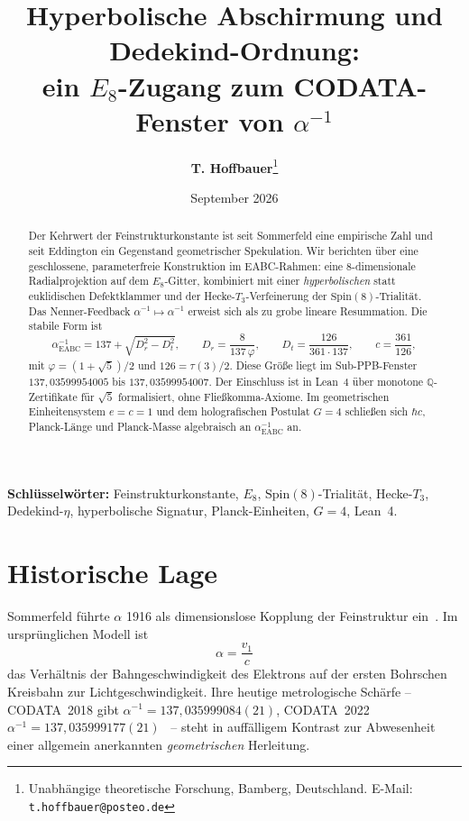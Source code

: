 \documentclass[11pt,a4paper]{article}
\title{\textbf{\texorpdfstring{Hyperbolische Abschirmung und Dedekind-Ordnung:\\
ein $E_8$-Zugang zum CODATA-Fenster von $\alpha^{-1}$}{Hyperbolische Abschirmung und Dedekind-Ordnung: ein E8-Zugang zum CODATA-Fenster von alpha^{-1}}}}
\author{\textbf{T. Hoffbauer}\thanks{Unabhängige theoretische Forschung, Bamberg, Deutschland.
E-Mail: \texttt{t.hoffbauer@posteo.de}}}
\date{September 2026}
\begin{document}
\maketitle

\begin{abstract}
\noindent
Der Kehrwert der Feinstrukturkonstante ist seit Sommerfeld eine empirische Zahl und seit Eddington ein Gegenstand geometrischer Spekulation.
Wir berichten über eine geschlossene, parameterfreie Konstruktion im EABC-Rahmen:
eine $8$-dimensionale Radialprojektion auf dem $E_8$-Gitter, kombiniert mit einer \emph{hyperbolischen} statt euklidischen Defektklammer und der Hecke-$T_3$-Verfeinerung der $\mathrm{Spin}(8)$-Trialität.
Das Nenner-Feedback $\alpha^{-1}\mapsto\alpha^{-1}$ erweist sich als zu grobe lineare Resummation.
Die stabile Form ist
\[
\alpha^{-1}_{\mathrm{EABC}}
= 137 + \sqrt{D_r^2 - D_t^2},\qquad
D_r=\frac{8}{137\,\varphi},\qquad
D_t=\frac{126}{361\cdot 137},\qquad
c=\frac{361}{126},
\]
mit $\varphi=(1+\sqrt{5})/2$ und $126=\tau(3)/2$.
Diese Größe liegt im Sub-PPB-Fenster $137{,}03599954005$ bis $137{,}03599954007$.
Der Einschluss ist in Lean~4 über monotone $\mathbb{Q}$-Zertifikate für $\sqrt{5}$ formalisiert, ohne Fließkomma-Axiome.
Im geometrischen Einheitensystem $e=c=1$ und dem holografischen Postulat $G=4$ schließen sich $\hbar c$, Planck-Länge und Planck-Masse algebraisch an $\alpha^{-1}_{\mathrm{EABC}}$ an.
\end{abstract}

\noindent\textbf{Schlüsselwörter:}
Feinstrukturkonstante, $E_8$, $\mathrm{Spin}(8)$-Trialität, Hecke-$T_3$,\\
Dedekind-$\eta$, hyperbolische Signatur, Planck-Einheiten, $G=4$, Lean~4.

\section{Historische Lage}

Sommerfeld führte $\alpha$ 1916 als dimensionslose Kopplung der Feinstruktur ein~\cite{sommerfeld1916}.
Im ursprünglichen Modell ist
\begin{equation}
\alpha=\frac{v_1}{c}
\end{equation}
das Verhältnis der Bahngeschwindigkeit des Elektrons auf der ersten Bohrschen Kreisbahn zur Lichtgeschwindigkeit.
Ihre heutige metrologische Schärfe -- CODATA~2018 gibt $\alpha^{-1}=137{,}035999084(21)$,
CODATA~2022 $\alpha^{-1}=137{,}035999177(21)$~\cite{codata2018,codata2022} --
steht in auffälligem Kontrast zur Abwesenheit einer allgemein anerkannten \emph{geometrischen} Herleitung.
\end{document}

